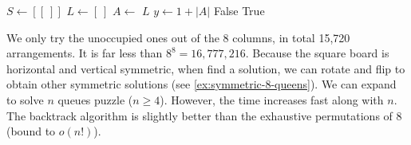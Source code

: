 \documentclass[b5paper]{article}
\begin{document}
\begin{algorithmic}[1]
  \State $S \gets [[\ ]]$
  \State $L \gets [\ ]$ 
    \State $A \gets$  
      \State {}
    \Else
          \State {}
        \EndIf
      \EndFor
    \EndIf
  \EndWhile
  \State \Return $L$
\EndFunction
\Statex
{}
  \State $y \gets 1 + |A|$
      \State \Return False
    \EndIf
  \EndFor
  \State \Return True
\EndFunction
\end{algorithmic}

We only try the unoccupied ones out of the 8 columns, in total 15,720 arrangements. It is far less than $8^8 = 16,777,216$\cite{wiki-8-queens}. Because the square board is horizontal and vertical symmetric, when find a solution, we can rotate and flip to obtain other symmetric solutions (see \cref{ex:symmetric-8-queens}). We can expand to solve $n$ queues puzzle ($n \geq 4$). However, the time increases fast along with $n$. The backtrack algorithm is slightly better than the exhaustive permutations of 8 (bound to $o(n!)$).

\begin{Exercise}\label{ex:queens-puzzle}

\end{Exercise}
\end{document}
